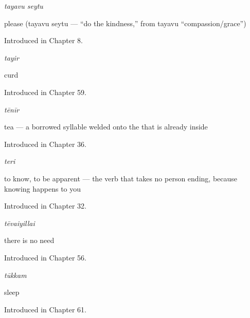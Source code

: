 \noindent\begin{minipage}[t]{\linewidth}
\raggedright
\textbf{}\enspace\emph{tayavu seytu}\par
\small please (tayavu seytu — \textquotedblleft{}do the kindness,\textquotedblright{} from  tayavu \textquotedblleft{}compassion/grace\textquotedblright{})\par
\footnotesize Introduced in Chapter 8.
\end{minipage}\par\medskip

\noindent\begin{minipage}[t]{\linewidth}
\raggedright
\textbf{}\enspace\emph{tayir}\par
\small curd\par
\footnotesize Introduced in Chapter 59.
\end{minipage}\par\medskip

\noindent\begin{minipage}[t]{\linewidth}
\raggedright
\textbf{}\enspace\emph{tēnīr}\par
\small tea — a borrowed syllable welded onto the  that is already inside \par
\footnotesize Introduced in Chapter 36.
\end{minipage}\par\medskip

\noindent\begin{minipage}[t]{\linewidth}
\raggedright
\textbf{}\enspace\emph{teri}\par
\small to know, to be apparent — the verb that takes no person ending, because knowing happens to you\par
\footnotesize Introduced in Chapter 32.
\end{minipage}\par\medskip

\noindent\begin{minipage}[t]{\linewidth}
\raggedright
\textbf{}\enspace\emph{tēvaiyillai}\par
\small there is no need\par
\footnotesize Introduced in Chapter 56.
\end{minipage}\par\medskip

\noindent\begin{minipage}[t]{\linewidth}
\raggedright
\textbf{}\enspace\emph{tūkkam}\par
\small sleep\par
\footnotesize Introduced in Chapter 61.
\end{minipage}\par\medskip

